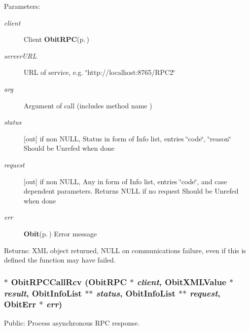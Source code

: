 \begin{Desc}
\item[Parameters:]
\begin{description}
\item[{\em client}]Client {\bf Obit\-RPC}{\rm (p.\,\pageref{structObitRPC})} \item[{\em server\-URL}]URL of service, e.g. \char`\"{}http://localhost:8765/RPC2\char`\"{} \item[{\em arg}]Argument of call (includes method name ) \item[{\em status}][out] if non NULL, Status in form of Info list, entries \char`\"{}code\char`\"{}, \char`\"{}reason\char`\"{} Should be Unrefed when done \item[{\em request}][out] if non NULL, Any in form of Info list, entries \char`\"{}code\char`\"{}, and case dependent parameters. Returns NULL if no request Should be Unrefed when done \item[{\em err}]{\bf Obit}{\rm (p.\,\pageref{structObit})} Error message \end{description}
\end{Desc}
\begin{Desc}
\item[Returns:]XML object returned, NULL on communications failure, even if this is defined the function may have failed. \end{Desc}
\subsubsection{$\ast$ Obit\-RPCCall\-Rcv ({\bf Obit\-RPC} $\ast$ {\em client}, {\bf Obit\-XMLValue} $\ast$ {\em result}, {\bf Obit\-Info\-List} $\ast$$\ast$ {\em status}, {\bf Obit\-Info\-List} $\ast$$\ast$ {\em request}, {\bf Obit\-Err} $\ast$ {\em err})}\label{ObitRPC_8c_a13}


Public: Process asynchronous RPC response. 

